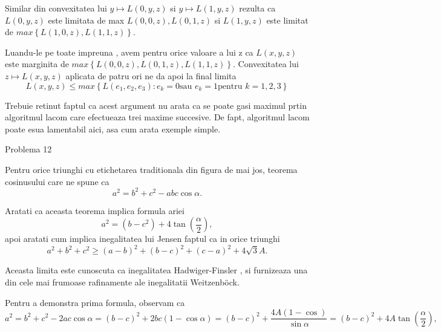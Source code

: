 \documentclass[a4paper,12pt,oneside]{report}
\begin{document}
 Similar din convexitatea lui \(y \mapsto L\left ( 0,y,z \right )\) si \(y \mapsto L\left ( 1,y,z \right )\)  rezulta ca \(L\left ( 0, y, z \right )\) este limitata de max  \(L\left ( 0,0,z \right ), L\left ( 0,1,z \right )\) si \( L\left ( 1,y,z \right )\) este limitat de \(max \left \{ L\left ( 1,0,z \right ) , L \left ( 1,1,z \right )\right \}\). 
 
 Luandu-le pe toate impreuna , avem pentru orice valoare a lui z ca \(L\left ( x,y,z \right )\) este marginita de \(max\left \{ L\left ( 0,0,z \right ), L\left ( 0,1,z \right ), L\left ( 1,1,z \right ) \right \}\). Convexitatea lui \(z \mapsto L\left ( x,y,z \right )\) aplicata de patru ori ne da apoi la final limita 
 \begin{displaymath}
  L\left ( x,y,z \right ) \leq  max \left \{ L\left ( e_{1} , e_{2}, e_{3}\right ): e_{k}  = 0 \text{sau } e_{k} = 1 \text{pentru } k = 1,2,3\right \}
\end{displaymath}
  
Trebuie retinut faptul  ca acest argument nu arata ca se poate gasi maximul prtin algoritmul lacom care efectueaza trei maxime succesive. De fapt, algoritmul lacom poate esua lamentabil aici, asa cum arata exemple simple. 

Problema 12

Pentru orice triunghi cu etichetarea traditionala din figura de mai jos, teorema cosinusului care ne spune ca 
\begin{displaymath}
  a^{2} = b^{2}+ c^{2} - abc\cos\alpha.
\end{displaymath}

Aratati ca aceasta teorema implica formula ariei 
\begin{displaymath}
  a^{2} = \left ( b - c^{2} \right ) + 4\tan \left ( \frac{\alpha }{2} \right ), 
\end{displaymath}
apoi aratati cum implica inegalitatea lui Jensen faptul ca in orice triunghi 
\begin{displaymath}
  a^{2} + b^{2} + c^{2} \geq  \left ( a - b  \right )^{2} + \left ( b- c  \right )^{2} + \left ( c - a \right )^{2} + 4\sqrt{3}A. 
\end{displaymath}

Aceasta limita este cunoscuta ca inegalitatea Hadwiger-Finsler , si furnizeaza una din cele mai frumoase rafinamente ale inegalitatii Weitzenböck. 

Pentru a demonstra prima formula, observam ca 
\begin{displaymath}
  a^{2} = b^{2} + c^{2} - 2ac\cos\alpha  = \left (  b - c \right )^{2} + 2bc\left ( 1 - \cos\alpha  \right ) = \left ( b - c \right )^{2} + \frac{4A\left ( 1 - \cos  \right )}{\sin \alpha } = \left ( b - c \right )^{2} + 4A\tan\left ( \frac{\alpha }{2} \right ),
\end{displaymath}
\end{document}
